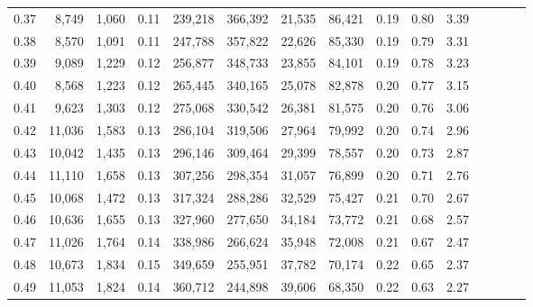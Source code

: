 \begin{tabular}{rrrcrrrrrrrrrrr}
0.37 &   8,749 &  1,060 &                                       0.11 &  239,218 &  366,392 &   21,535 &   86,421 &  0.19 &  0.80 &                         3.39 \\
0.38 &   8,570 &  1,091 &                                       0.11 &  247,788 &  357,822 &   22,626 &   85,330 &  0.19 &  0.79 &                         3.31 \\
0.39 &   9,089 &  1,229 &                                       0.12 &  256,877 &  348,733 &   23,855 &   84,101 &  0.19 &  0.78 &                         3.23 \\
0.40 &   8,568 &  1,223 &                                       0.12 &  265,445 &  340,165 &   25,078 &   82,878 &  0.20 &  0.77 &                         3.15 \\
0.41 &   9,623 &  1,303 &                                       0.12 &  275,068 &  330,542 &   26,381 &   81,575 &  0.20 &  0.76 &                         3.06 \\
0.42 &  11,036 &  1,583 &                                       0.13 &  286,104 &  319,506 &   27,964 &   79,992 &  0.20 &  0.74 &                         2.96 \\
0.43 &  10,042 &  1,435 &                                       0.13 &  296,146 &  309,464 &   29,399 &   78,557 &  0.20 &  0.73 &                         2.87 \\
0.44 &  11,110 &  1,658 &                                       0.13 &  307,256 &  298,354 &   31,057 &   76,899 &  0.20 &  0.71 &                         2.76 \\
0.45 &  10,068 &  1,472 &                                       0.13 &  317,324 &  288,286 &   32,529 &   75,427 &  0.21 &  0.70 &                         2.67 \\
0.46 &  10,636 &  1,655 &                                       0.13 &  327,960 &  277,650 &   34,184 &   73,772 &  0.21 &  0.68 &                         2.57 \\
0.47 &  11,026 &  1,764 &                                       0.14 &  338,986 &  266,624 &   35,948 &   72,008 &  0.21 &  0.67 &                         2.47 \\
0.48 &  10,673 &  1,834 &                                       0.15 &  349,659 &  255,951 &   37,782 &   70,174 &  0.22 &  0.65 &                         2.37 \\
0.49 &  11,053 &  1,824 &                                       0.14 &  360,712 &  244,898 &   39,606 &   68,350 &  0.22 &  0.63 &                         2.27 \\

\end{tabular}
